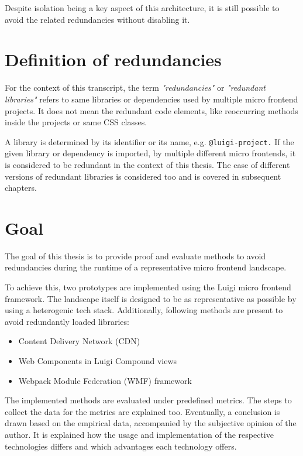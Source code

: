 Despite isolation being a key aspect of this architecture, it is still possible to avoid the related redundancies without disabling it.

\section{Definition of redundancies}

For the context of this transcript, the term \textit{"redundancies"} or \textit{"redundant libraries"} refers to same libraries or dependencies used by multiple micro frontend projects. It does not mean the redundant code elements, like reoccurring methods inside the projects or same CSS classes. 

A library is determined by its identifier or its name, e.g. \texttt{@luigi-project.} If the given library or dependency is imported, by multiple different micro frontends, it is considered to be redundant in the context of this thesis. The case of different versions of redundant libraries is considered too and is covered in subsequent chapters.

\section{Goal}

The goal of this thesis is to provide proof and evaluate methods to avoid redundancies during the runtime of a representative micro frontend landscape. 

To achieve this, two prototypes are implemented using the Luigi micro frontend framework. The landscape itself is designed to be as representative as possible by using a heterogenic tech stack. Additionally, following methods are present to avoid redundantly loaded libraries:

\begin{itemize}[noitemsep]
	\item Content Delivery Network (CDN)
	\item Web Components in Luigi Compound views
	\item Webpack Module Federation (WMF) framework
\end{itemize}

The implemented methods are evaluated under predefined metrics. The steps to collect the data for the metrics are explained too.
Eventually, a conclusion is drawn based on the empirical data, accompanied by the subjective opinion of the author. It is explained how the usage and implementation of the respective technologies differs and which advantages each technology offers.
  
